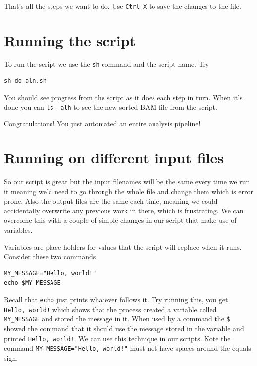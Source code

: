 \documentclass[]{book}
\begin{document}
That's all the steps we want to do. Use \texttt{Ctrl-X} to save the changes to the file.

\hypertarget{running-the-script}{%
\section{Running the script}\label{running-the-script}}

To run the script we use the \texttt{sh} command and the script name. Try

\begin{verbatim}
sh do_aln.sh
\end{verbatim}

You should see progress from the script as it does each step in turn. When it's done you can \texttt{ls\ -alh} to see the new sorted BAM file from the script.

Congratulations! You just automated an entire analysis pipeline!

\hypertarget{running-on-different-input-files}{%
\section{Running on different input files}\label{running-on-different-input-files}}

So our script is great but the input filenames will be the same every time we run it meaning we'd need to go through the whole file and change them which is error prone. Also the output files are the same each time, meaning we could accidentally overwrite any previous work in there, which is frustrating. We can overcome this with a couple of simple changes in our script that make use of variables.

Variables are place holders for values that the script will replace when it runs. Consider these two commands

\begin{verbatim}
MY_MESSAGE="Hello, world!"
echo $MY_MESSAGE
\end{verbatim}

Recall that \texttt{echo} just prints whatever follows it. Try running this, you get \texttt{Hello,\ world!} which shows that the process created a variable called \texttt{MY\_MESSAGE} and stored the message in it. When used by a command the \texttt{\$} showed the command that it should use the message stored in the variable and printed \texttt{Hello,\ world!}. We can use this technique in our scripts. Note the command \texttt{MY\_MESSAGE="Hello,\ world!"} must not have spaces around the equals sign.
\end{document}

